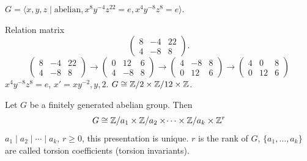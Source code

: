 \documentclass[10pt, a4paper]{article}
\begin{document}
\begin{example}
    $G = \langle x, y, z \mid \text{abelian}, x ^ 8y ^ {-4}z ^ {22} = e, x ^ 4y ^ {-8}z ^ 8 = e\rangle$.

    Relation matrix
    \[
    \begin{pmatrix}
        8 & -4 & 22 \\ 4 & -8 & 8
    \end{pmatrix}.
    \]
    \[
    \begin{pmatrix}
        8 & -4 & 22 \\ 4 & -8 & 8
    \end{pmatrix} \to \begin{pmatrix}
        0 & 12 & 6 \\
        4 & -8 & 8
    \end{pmatrix} \to \begin{pmatrix}
        4 & -8 & 8 \\ 0 & 12 & 6
    \end{pmatrix} \to \begin{pmatrix}
        4 & 0 & 8 \\ 0 & 12 & 6
    \end{pmatrix}
    \]
    $x ^ 4y ^ {-8}z ^ 8 = e$,
    $x' = xy ^ {-2}, y, 2$.
    $G \cong \mathbb{Z} / 2 \times \mathbb{Z} / 12 \times \mathbb{Z}$.
\end{example}

\begin{theorem}
    Let $G$ be a finitely generated abelian group.
    Then
    \[
    G \cong \mathbb{Z} / a_1 \times \mathbb{Z} / a_2 \times \dotsi \times \mathbb{Z} / a_k \times \mathbb{Z} ^ r
    \]
    $a_1 \mid a_2 \mid \dotsi \mid a_k$,
    $r \geq 0$,
    this presentation is unique.
    $r$ is the rank of $G$,
    $\{a_1, \dotsc, a_k\}$ are called torsion coefficients
    (torsion invariants).
\end{theorem}
\end{document}
